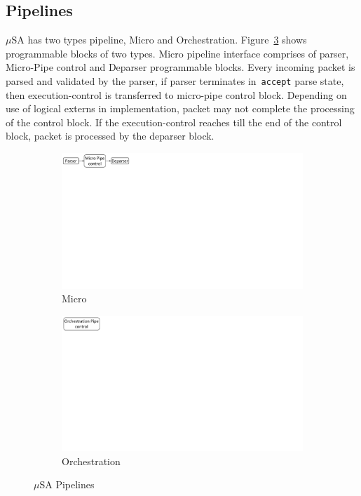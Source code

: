 \documentclass[10pt,sigconf,letterpaper,anonymous]{acmart}
\begin{document}
\subsection{Pipelines}
\label{subsection-pipelines}
$\mu$SA has two types pipeline, Micro and Orchestration.
Figure~\ref{fig:msa-pipelines} shows programmable blocks of two types.
Micro pipeline interface comprises of parser, Micro-Pipe control and Deparser programmable blocks.
Every incoming packet is parsed and validated by the parser, if parser terminates in~\texttt{accept} parse state, then execution-control is transferred to micro-pipe control block.
Depending on use of logical externs in implementation, packet may not complete the processing of the control block.
If the execution-control reaches till the end of the control block, packet is processed by the deparser block.
\begin{figure}[!h]
    \begin{subfigure}{0.45\linewidth}
        \centering
        \includegraphics[trim=0 482 692 0, clip,scale=0.45]{msa-pipeline}
        \caption{Micro}
        \label{subfig:micro}
    \end{subfigure}
    \begin{subfigure}{0.45\linewidth}
        \centering
        \includegraphics[trim=0 480 805 0,clip,scale=0.45]{micro-orchestration-pipeline}
        \caption{Orchestration}
        \label{subfig:orchestration}
    \end{subfigure}
\caption{$\mu$SA Pipelines}
\label{fig:msa-pipelines}
\end{figure}
\end{document}
